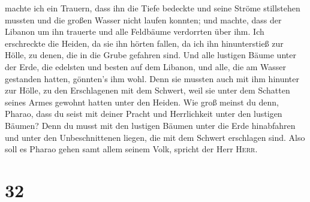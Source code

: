 machte ich ein Trauern, dass ihn die Tiefe bedeckte und seine Ströme
stillstehen mussten und die großen Wasser nicht laufen konnten; und
machte, dass der Libanon um ihn trauerte und alle Feldbäume verdorrten
über ihm.  Ich erschreckte die Heiden, da sie ihn hörten
fallen, da ich ihn hinunterstieß zur Hölle, zu denen, die in die Grube
gefahren sind. Und alle lustigen Bäume unter der Erde, die edelsten und
besten auf dem Libanon, und alle, die am Wasser gestanden hatten,
gönnten's ihm wohl.  Denn sie mussten auch mit ihm
hinunter zur Hölle, zu den Erschlagenen mit dem Schwert, weil sie unter
dem Schatten seines Armes gewohnt hatten unter den Heiden.
 Wie groß meinst du denn, Pharao, dass du seist mit
deiner Pracht und Herrlichkeit unter den lustigen Bäumen? Denn du musst
mit den lustigen Bäumen unter die Erde hinabfahren und unter den
Unbeschnittenen liegen, die mit dem Schwert erschlagen sind. Also soll
es Pharao gehen samt allem seinem Volk, spricht der Herr \textsc{Herr}.

\hypertarget{section-31}{%
\section{32}\label{section-31}}

